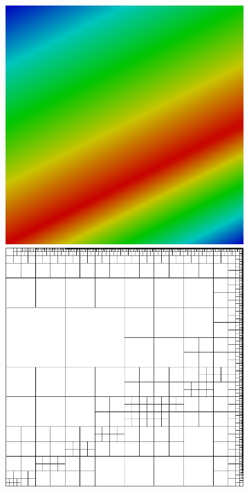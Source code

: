 \documentclass[letterpaper]{article}
\begin{document}
\begin{figure}[p]
\centering
\begin{subfigure}[t]{0.45\textwidth}
\centering
\includegraphics[width=\textwidth]{figs/Confusion/modified8nc.png}
\includegraphics[width=\textwidth]{figs/Confusion/modified8nc_mesh.png}

\end{subfigure}
\end{figure}
\end{document}
